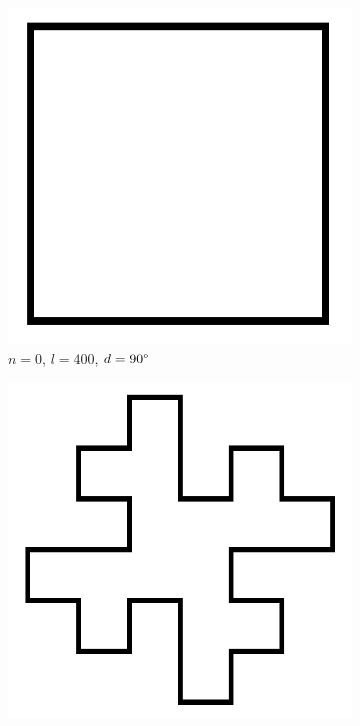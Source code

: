\begin{figure} [hbtp]
	\centering
	\begin{subfigure}[t]{.4\textwidth}
		\includegraphics[width=\linewidth]{images/KochkurveN0L400.png}
		\caption{$n=0$, $l=400$, $d=90\degree$}
		\label{fig:KochkurveN0L400}
	\end{subfigure}
	\hspace{.1\textwidth}
	\begin{subfigure}[t]{.4\textwidth}
		\centering
		\includegraphics[width=\linewidth]{images/KochkurveN1L100.png}

\end{subfigure}
\end{figure}
